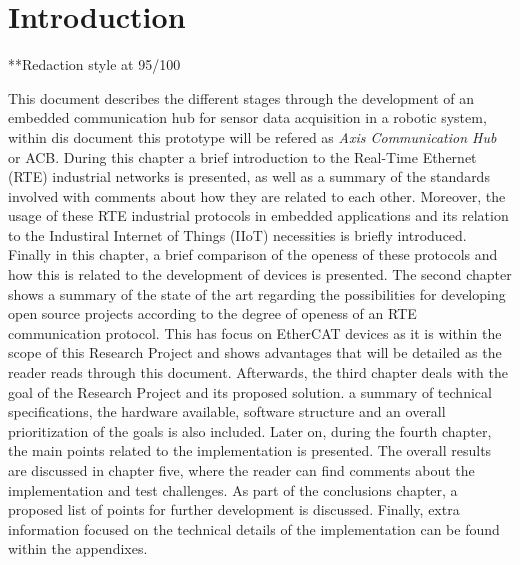 \chapter{Introduction}
**Redaction style at 95/100
%
%  
%
%


This document describes the different stages through the development of an embedded communication hub for sensor
data acquisition in a robotic system, within dis document this prototype will be refered as \emph{Axis Communication Hub} or ACB. 
During this chapter a brief introduction to the Real-Time Ethernet (RTE) industrial networks is presented, as well as 
a summary of the standards involved with comments about how they are related to each other. Moreover, the usage of these RTE 
industrial protocols in embedded applications and its relation to the Industiral Internet of Things (IIoT) necessities is 
briefly introduced. Finally in this chapter, a brief comparison of the openess of these protocols and how this is related 
to the development of devices is presented. 
The second chapter shows a summary of the state of the art regarding the possibilities for developing open source projects 
according to the degree of openess of an RTE communication protocol. This has focus on EtherCAT devices as it is within the 
scope of this Research Project and shows advantages that will be detailed as the reader reads through this document. 
Afterwards, the third chapter deals with the goal of the Research Project and its proposed solution. 
a summary of technical specifications, the hardware available, software structure and an overall prioritization of the goals
is also included. 
Later on, during the fourth chapter, the main points related to the implementation is presented. 
The overall results are discussed in chapter five, where the reader can find comments about the implementation and test 
challenges. As part of the conclusions chapter, a proposed list of points for further development is discussed. 
Finally, extra information focused on the technical details of the implementation can be found within the appendixes.

